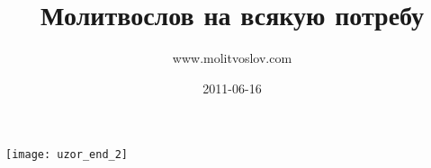 \documentclass[11pt,oneside]{book}
\title{Молитвослов на всякую потребу}
\author{www.molitvoslov.com}
\date{2011-06-16}
\newcommand{\ornament}{uzor_begin_2}
\begin{document}
%

\maketitle \tableofcontents

\begin{center}\texttt{[image: uzor\_end\_2]}\end{center}

\renewcommand{\ornament}{uzor_begin_5}




\end{document}
